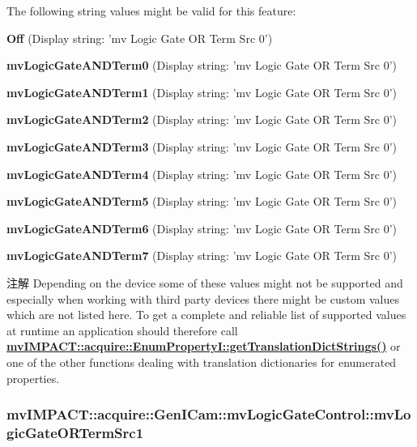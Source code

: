 The following string values might be valid for this feature\+:
\begin{DoxyItemize}
\item {\bfseries Off} (Display string\+: 'mv Logic Gate O\+R Term Src 0')
\item {\bfseries mv\+Logic\+Gate\+A\+N\+D\+Term0} (Display string\+: 'mv Logic Gate O\+R Term Src 0')
\item {\bfseries mv\+Logic\+Gate\+A\+N\+D\+Term1} (Display string\+: 'mv Logic Gate O\+R Term Src 0')
\item {\bfseries mv\+Logic\+Gate\+A\+N\+D\+Term2} (Display string\+: 'mv Logic Gate O\+R Term Src 0')
\item {\bfseries mv\+Logic\+Gate\+A\+N\+D\+Term3} (Display string\+: 'mv Logic Gate O\+R Term Src 0')
\item {\bfseries mv\+Logic\+Gate\+A\+N\+D\+Term4} (Display string\+: 'mv Logic Gate O\+R Term Src 0')
\item {\bfseries mv\+Logic\+Gate\+A\+N\+D\+Term5} (Display string\+: 'mv Logic Gate O\+R Term Src 0')
\item {\bfseries mv\+Logic\+Gate\+A\+N\+D\+Term6} (Display string\+: 'mv Logic Gate O\+R Term Src 0')
\item {\bfseries mv\+Logic\+Gate\+A\+N\+D\+Term7} (Display string\+: 'mv Logic Gate O\+R Term Src 0')
\end{DoxyItemize}

\begin{DoxyNote}{注解}
Depending on the device some of these values might not be supported and especially when working with third party devices there might be custom values which are not listed here. To get a complete and reliable list of supported values at runtime an application should therefore call {\bfseries \hyperlink{classmv_i_m_p_a_c_t_1_1acquire_1_1_enum_property_i_a0ba6ccbf5ee69784d5d0b537924d26b6}{mv\+I\+M\+P\+A\+C\+T\+::acquire\+::\+Enum\+Property\+I\+::get\+Translation\+Dict\+Strings()}} or one of the other functions dealing with translation dictionaries for enumerated properties. 
\end{DoxyNote}
\hypertarget{classmv_i_m_p_a_c_t_1_1acquire_1_1_gen_i_cam_1_1mv_logic_gate_control_acede1a2a2dc54878a67f52f25aec782b}{
\subsubsection[{mv\+Logic\+Gate\+O\+R\+Term\+Src1}]{ mv\+I\+M\+P\+A\+C\+T\+::acquire\+::\+Gen\+I\+Cam\+::mv\+Logic\+Gate\+Control\+::mv\+Logic\+Gate\+O\+R\+Term\+Src1}}\label{classmv_i_m_p_a_c_t_1_1acquire_1_1_gen_i_cam_1_1mv_logic_gate_control_acede1a2a2dc54878a67f52f25aec782b}


